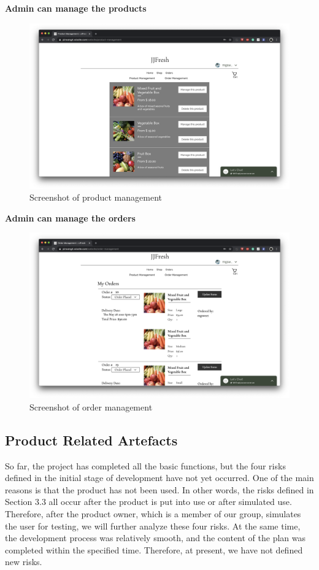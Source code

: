 \documentclass{report}
\begin{document}
\clearpage
\textbf{Admin can manage the products}
\begin{figure}[htp]
\centering
\includegraphics[width=\textwidth]{Figures/adminProduct.png}
\caption{Screenshot of product management}
\label{fig:adminProduct}
\end{figure}

\clearpage
\textbf{Admin can manage the orders}
\begin{figure}[htp]
\centering
\includegraphics[width=\textwidth]{Figures/adminOrder.png}
\caption{Screenshot of order management}
\label{fig:adminOrder}
\end{figure}

\subsection{Product Related Artefacts}
So far, the project has completed all the basic functions, but the four risks defined in the initial stage of development have not yet occurred. One of the main reasons is that the product has not been used. In other words, the risks defined in Section 3.3 all occur after the product is put into use or after simulated use. Therefore, after the product owner, which is a member of our group, simulates the user for testing, we will further analyze these four risks.
At the same time, the development process was relatively smooth, and the content of the plan was completed within the specified time. Therefore, at present, we have not defined new risks.
\end{document}
